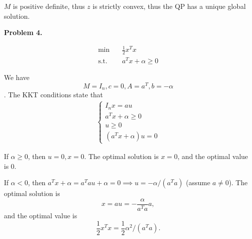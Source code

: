 \documentclass[12pt]{article}
\begin{document}
$M$ is positive definite, thus $z$ is strictly convex, thus the QP has a unique global solution.

\noindent
\textbf{Problem 4.}

\begin{align*}
    \text{min}\quad & \frac{1}{2}x^Tx \\
    \text{s.t.}\quad & a^Tx+\alpha \ge 0
\end{align*}

We have \[M=I_n, c=0, A=a^T, b=-\alpha\]. The KKT conditions state that
\begin{align*}
\begin{cases}
    I_nx=au \\
    a^Tx+\alpha \ge 0 \\
    u \ge 0 \\
    (a^Tx+\alpha)u=0
\end{cases}
\end{align*}

If $\alpha \ge 0$, then $u=0, x=0$. The optimal solution is $x=0$, and the optimal value is $0$.

If $\alpha < 0$, then $a^Tx+\alpha = a^Tau+\alpha = 0 \implies u=-\alpha/(a^Ta)$ (assume $a\ne 0$). The optimal solution is \[x=au = -\frac{\alpha} {a^Ta}a,\] and the optimal value is \[\frac{1}{2}x^Tx = \frac{1}{2} \alpha^2/(a^Ta).\]


\end{document}
